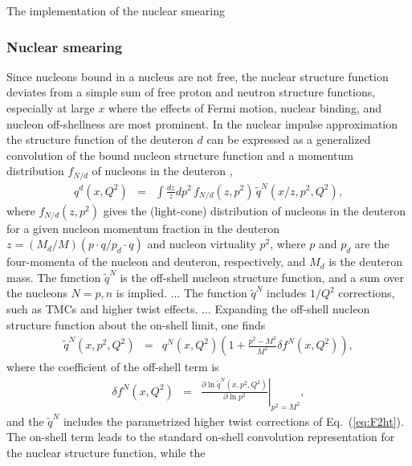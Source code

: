 \documentclass[aps,prd,amsmath,preprint]{revtex4}
\begin{document}
The implementation of the nuclear smearing 





\subsubsection{Nuclear smearing}

Since nucleons bound in a nucleus are not free, the nuclear structure
function deviates from a simple sum of free proton and neutron
structure functions, especially at large $x$ where the effects of
Fermi motion, nuclear binding, and nucleon off-shellness are most
prominent.
In the nuclear impulse approximation the structure function of the
deuteron $d$ can be expressed as a generalized convolution of the
bound nucleon structure function and a momentum distribution
$f_{N/d}$ of nucleons in the deuteron \cite{MSToff, KPW94},
%
\begin{eqnarray}
q^d(x,Q^2)
&=& \int \frac{dz}{z} dp^2\, f_{N/d}(z,p^2)\, \widetilde{q}^N(x/z,p^2,Q^2),
\label{eq:genconv}
\end{eqnarray}
%
where $f_{N/d}(z,p^2)$ gives the (light-cone) distribution of nucleons
in the deuteron for a given nucleon momentum fraction in the deuteron
$z = (M_d/M)(p \cdot q / p_d \cdot q)$ and nucleon virtuality $p^2$,
where $p$ and $p_d$ are the four-momenta of the nucleon and deuteron,
respectively, and $M_d$ is the deuteron mass.
The function $\widetilde{q}^N$ is the off-shell nucleon structure
function, and a sum over the nucleons $N = p, n$ is implied.
...
The function $\widetilde{q}^N$ includes $1/Q^2$ corrections,
such as TMCs and higher twist effects.
...
%
Expanding the off-shell nucleon structure function about the
on-shell limit, one finds \cite{KP06}
%
\begin{eqnarray}
\widetilde{q}^N (x,p^2,Q^2)
&=& q^N(x,Q^2)
    \left( 1 + \frac{p^2-M^2}{M^2} \delta f^N(x,Q^2) \right),
\end{eqnarray}     
%
where the coefficient of the off-shell term is
%
\begin{eqnarray}
\delta f^N(x,Q^2)
&=& \left.
    \frac{\partial \ln \widetilde{q}^N(x,p^2,Q^2)}
	 {\partial \ln p^2}
    \right|_{p^2=M^2},
\end{eqnarray}
%
and the $\widetilde{q}^N$ includes the parametrized higher twist
corrections of Eq.~(\ref{eq:F2ht}).
%
The on-shell term leads to the standard on-shell convolution
representation for the nuclear structure function, while the
\end{document}
